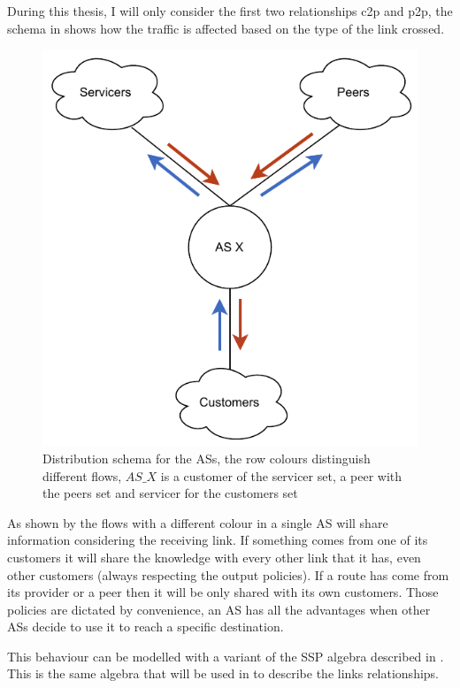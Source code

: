 During this thesis, I will only consider the first two relationships \ac{c2p} and
\ac{p2p}, the schema in  shows how the traffic is affected
based on the type of the link crossed.

\begin{figure}[ht]
    \centering
    \includegraphics[scale=0.75]{images/BGP/ASKnowledgeDistribution.pdf}
	\caption{Distribution schema for the \acp{AS}, the row colours distinguish
	different flows, $AS\_X$ is a customer of the servicer set, a peer with the
	peers set and servicer for the customers set}
    \label{fig:AS_flow}
\end{figure}


As shown by the flows with a different colour in  a single
\ac{AS} will share information considering the receiving link.
If something comes from one of its customers it will share the knowledge with
every other link that it has, even other customers (always respecting the output policies).
If a route has come from its provider or a peer then it will be only shared with 
its own customers.
Those policies are dictated by convenience, an \ac{AS} has all the advantages when
other \acp{AS} decide to use it to reach a specific destination.

This behaviour can be modelled with a variant of the \ac{SSP} algebra described
in \cite{daggitt2018rate}.
This is the same algebra that will be used in  to describe the links
relationships.

